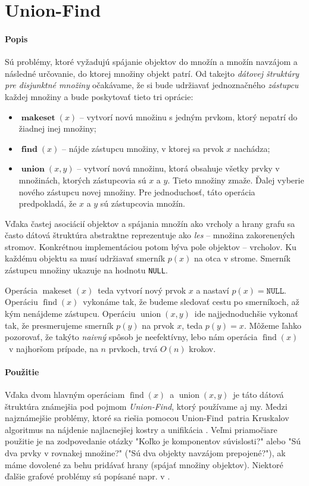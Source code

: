 \def\uf{Union-Find}
\def\null{\texttt{NULL}}
\def\makeset{$\mathop{makeset}(x)$}
\def\find{$\mathop{find}(x)$}
\def\union{$\mathop{union}(x, y)$}

\section{\uf}
\paragraph{Popis}
Sú problémy, ktoré vyžadujú spájanie objektov do množín a množín navzájom 
a následné určovanie, do ktorej množiny objekt patrí. Od takejto \emph{
dátovej štruktúry pre disjunktné množiny} očakávame, že si bude udržiavať 
jednoznačného \emph{zástupcu} každej množiny a bude poskytovať 
tieto tri oprácie: 
\begin{itemize}
\item $\mathop{\mathbf{makeset}}(x)$ -- vytvorí novú množinu s jedným prvkom, 
ktorý nepatrí do žiadnej inej množiny;
\item $\mathop{\mathbf{find}}(x)$ -- nájde zástupcu množiny, v ktorej sa 
prvok $x$ nachádza;
\item $\mathop{\mathbf{union}}(x, y)$ -- vytvorí novú množinu, ktorá obsahuje 
všetky prvky v množinách, ktorých zástupcovia sú $x$ a $y$. Tieto 
množiny zmaže. Ďalej vyberie nového zástupcu novej množiny. Pre 
jednoduchosť, táto operácia predpokladá, že $x$ a $y$ sú 
zástupcovia množín.
\end{itemize}
Vďaka častej asociácií objektov a spájania množín ako vrcholy a hrany grafu 
sa často dátová štruktúra abstraktne reprezentuje ako 
\emph{les} -- množina zakorenených stromov. 
Konkrétnou implementáciou potom býva pole objektov -- vrcholov. Ku každému 
objektu sa musí udržiavať smerník $p(x)$ na otca v strome. Smerník zástupcu 
množiny ukazuje na hodnotu \null.

Operácia \makeset\ teda vytvorí nový prvok $x$ a nastaví $p(x) = \null$. 
Operáciu \find\ vykonáme tak, že budeme sledovať cestu po smerníkoch, až 
kým nenájdeme zástupcu. 
Operáciu \union\ ide najjednoduchšie vykonať tak, že presmerujeme smerník 
$p(y)$ na prvok $x$, teda $p(y) = x$. 
Môžeme ľahko pozorovať, že takýto \emph{naivný} spôsob je neefektívny, 
lebo nám operácia \find\ v najhoršom prípade, na $n$ prvkoch, trvá $O(n)$ 
krokov. 

\paragraph{Použitie}
Vďaka dvom hlavným operáciam \find\ a \union\ 
je táto dátová štruktúra známejšia pod pojmom \emph{\uf}, ktorý 
používame aj my. Medzi najznámejšie problémy, ktoré sa riešia pomocou 
\uf\ patria Kruskalov algoritmus na nájdenie najlacnejšej kostry 
\citep{kruskal} a unifikácia \citep{unif}. Veľmi priamočiare použitie je 
na zodpovedanie otázky "Koľko je komponentov súvislosti?" alebo
"Sú dva prvky v rovnakej množine?" ("Sú dva objekty navzájom prepojené?"), 
ak máme dovolené za behu pridávať hrany (spájať množiny objektov). 
Niektoré ďalšie grafové problémy sú popísané napr. v \citet{paths1}.



